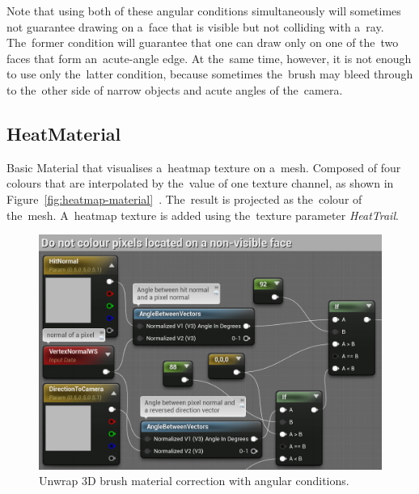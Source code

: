 Note that using both of these angular conditions simultaneously will sometimes not guarantee drawing on a~face that is visible but not colliding with a~ray. The~former condition will guarantee that one can draw only on one of the~two faces that form an~acute-angle edge. At the~same time, however, it is not enough to use only the~latter condition, because sometimes the~brush may bleed through to the~other side of narrow objects and acute angles of the~camera.

\subsection{HeatMaterial}
\label{sec:heat-material-implementation}

Basic Material that visualises a~heatmap texture on a~mesh. Composed of four colours that are interpolated by the~value of one texture channel, as shown in Figure~\ref{fig:heatmap-material}~\cite{basic-heatmap-tutorial}. The~result is projected as the~colour of the~mesh. A~heatmap texture is added using the~texture parameter \emph{HeatTrail}. 

\pagebreak{}

\begin{figure}[!htb]\centering
    \includegraphics[width=\textwidth]{img/unwrap-brush-correction.png}
    \caption{Unwrap 3D brush material correction with angular conditions.}
    \label{fig:unwrap-brush-correction}
\end{figure}


